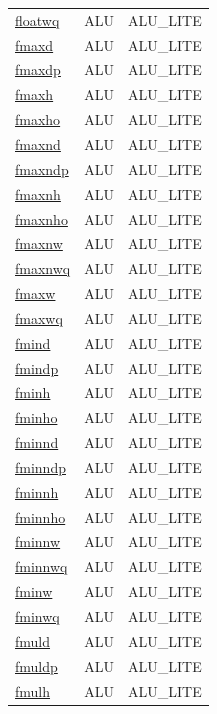 \begin{small}
\begin{longtable}[l]{l l l}
\hyperlink{lvx.floatwq}{floatwq} & ALU & ALU\_LITE \\ 
\hyperlink{lvx.fmaxd}{fmaxd} & ALU & ALU\_LITE \\ 
\hyperlink{lvx.fmaxdp}{fmaxdp} & ALU & ALU\_LITE \\ 
\hyperlink{lvx.fmaxh}{fmaxh} & ALU & ALU\_LITE \\ 
\hyperlink{lvx.fmaxho}{fmaxho} & ALU & ALU\_LITE \\ 
\hyperlink{lvx.fmaxnd}{fmaxnd} & ALU & ALU\_LITE \\ 
\hyperlink{lvx.fmaxndp}{fmaxndp} & ALU & ALU\_LITE \\ 
\hyperlink{lvx.fmaxnh}{fmaxnh} & ALU & ALU\_LITE \\ 
\hyperlink{lvx.fmaxnho}{fmaxnho} & ALU & ALU\_LITE \\ 
\hyperlink{lvx.fmaxnw}{fmaxnw} & ALU & ALU\_LITE \\ 
\hyperlink{lvx.fmaxnwq}{fmaxnwq} & ALU & ALU\_LITE \\ 
\hyperlink{lvx.fmaxw}{fmaxw} & ALU & ALU\_LITE \\ 
\hyperlink{lvx.fmaxwq}{fmaxwq} & ALU & ALU\_LITE \\ 
\hyperlink{lvx.fmind}{fmind} & ALU & ALU\_LITE \\ 
\hyperlink{lvx.fmindp}{fmindp} & ALU & ALU\_LITE \\ 
\hyperlink{lvx.fminh}{fminh} & ALU & ALU\_LITE \\ 
\hyperlink{lvx.fminho}{fminho} & ALU & ALU\_LITE \\ 
\hyperlink{lvx.fminnd}{fminnd} & ALU & ALU\_LITE \\ 
\hyperlink{lvx.fminndp}{fminndp} & ALU & ALU\_LITE \\ 
\hyperlink{lvx.fminnh}{fminnh} & ALU & ALU\_LITE \\ 
\hyperlink{lvx.fminnho}{fminnho} & ALU & ALU\_LITE \\ 
\hyperlink{lvx.fminnw}{fminnw} & ALU & ALU\_LITE \\ 
\hyperlink{lvx.fminnwq}{fminnwq} & ALU & ALU\_LITE \\ 
\hyperlink{lvx.fminw}{fminw} & ALU & ALU\_LITE \\ 
\hyperlink{lvx.fminwq}{fminwq} & ALU & ALU\_LITE \\ 
\hyperlink{lvx.fmuld}{fmuld} & ALU & ALU\_LITE \\ 
\hyperlink{lvx.fmuldp}{fmuldp} & ALU & ALU\_LITE \\ 
\hyperlink{lvx.fmulh}{fmulh} & ALU & ALU\_LITE \\ 

\end{longtable}
\end{small}
